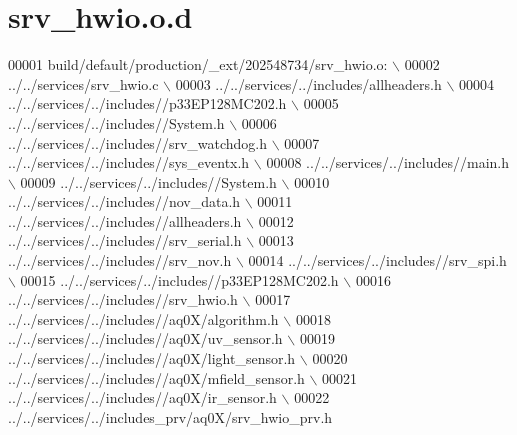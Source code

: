 \hypertarget{a00059_source}{\section{srv\+\_\+hwio.\+o.\+d}
\label{a00059_source}
}

\begin{DoxyCode}
00001 build/\textcolor{keywordflow}{default}/production/\_ext/202548734/srv\_hwio.o:  \(\backslash\)
00002  ../../services/srv\_hwio.c  \(\backslash\)
00003 ../../services/../includes/allheaders.h  \(\backslash\)
00004 ../../services/../includes\textcolor{comment}{//p33EP128MC202.h  \(\backslash\)}
00005 \textcolor{comment}{../../services/../includes//System.h  \(\backslash\)}
00006 \textcolor{comment}{../../services/../includes//srv\_watchdog.h  \(\backslash\)}
00007 \textcolor{comment}{../../services/../includes//sys\_eventx.h  \(\backslash\)}
00008 \textcolor{comment}{../../services/../includes//main.h  \(\backslash\)}
00009 \textcolor{comment}{../../services/../includes//System.h  \(\backslash\)}
00010 \textcolor{comment}{../../services/../includes//nov\_data.h  \(\backslash\)}
00011 \textcolor{comment}{../../services/../includes//allheaders.h  \(\backslash\)}
00012 \textcolor{comment}{../../services/../includes//srv\_serial.h  \(\backslash\)}
00013 \textcolor{comment}{../../services/../includes//srv\_nov.h  \(\backslash\)}
00014 \textcolor{comment}{../../services/../includes//srv\_spi.h  \(\backslash\)}
00015 \textcolor{comment}{../../services/../includes//p33EP128MC202.h  \(\backslash\)}
00016 \textcolor{comment}{../../services/../includes//srv\_hwio.h  \(\backslash\)}
00017 \textcolor{comment}{../../services/../includes//aq0X/algorithm.h  \(\backslash\)}
00018 \textcolor{comment}{../../services/../includes//aq0X/uv\_sensor.h  \(\backslash\)}
00019 \textcolor{comment}{../../services/../includes//aq0X/light\_sensor.h  \(\backslash\)}
00020 \textcolor{comment}{../../services/../includes//aq0X/mfield\_sensor.h  \(\backslash\)}
00021 \textcolor{comment}{../../services/../includes//aq0X/ir\_sensor.h  \(\backslash\)}
00022 \textcolor{comment}{../../services/../includes\_prv/aq0X/srv\_hwio\_prv.h }
\end{DoxyCode}
